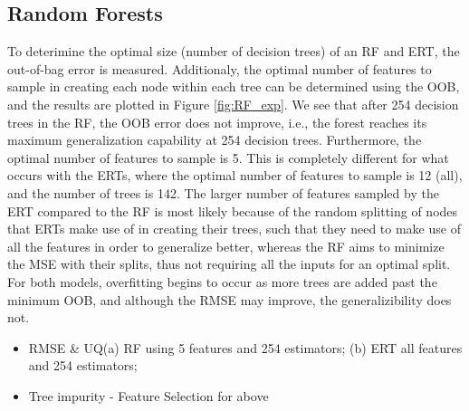 \documentclass[a4paper, twoside, final, 12pt]{article}
\begin{document}
{\subsection{Random Forests}
To deterimine the optimal size (number of decision trees) of an RF and ERT, the out-of-bag error is measured. Additionaly, the optimal number of features to sample in creating each node within each tree can be determined using the OOB, and the results are plotted in Figure \ref{fig:RF_exp}. We see that after 254 decision trees in the RF, the OOB error does not improve, i.e., the forest reaches its maximum generalization capability at 254 decision trees. Furthermore, the optimal number of features to sample is 5. This is completely different for what occurs with the ERTs, where the optimal number of features to sample is 12 (all), and the number of trees is 142. The larger number of features sampled by the ERT compared to the RF is most likely because of the random splitting of nodes that ERTs make use of in creating their trees, such that they need to make use of all the features in order to generalize better, whereas the RF aims to minimize the MSE with their splits, thus not requiring all the inputs for an optimal split. For both models, overfitting begins to occur as more trees are added past the minimum OOB, and although the RMSE may improve, the generalizibility does not.
 
\begin{itemize}
\item RMSE \& UQ(a) RF using 5 features and 254 estimators;  (b) ERT all features and 254 estimators; 
\item Tree impurity - Feature Selection for above 
\end{itemize}

}
\end{document}
